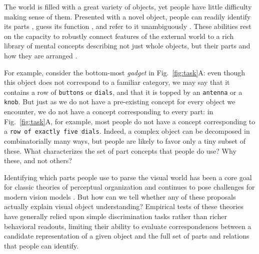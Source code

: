 \documentclass[10pt,letterpaper]{article}
\newcommand{\jda}[1]{{\color{blue}[jda: #1]}}
\begin{document}
\noindent The world is filled with a great variety of objects, yet people have little difficulty making sense of them. 
Presented with a novel object, people can readily identify its parts , guess its function , and refer to it unambiguously . 
These abilities rest on the capacity to robustly connect features of the external world to a rich library of mental concepts describing not just whole objects, but their parts and how they are arranged . 

For example, consider the bottom-most \emph{gadget} in Fig.~\ref{fig:task}A: even though this object does not correspond to a familiar category, we may say that it contains a row of \texttt{buttons} or \texttt{dials}, and that it is topped by an \texttt{antenna} or a \texttt{knob}.
But just as we do not have a pre-existing concept for every object we encounter, we do not have a concept corresponding to every part: in Fig.~\ref{fig:task}A, for example, most people do not have a concept corresponding to a \texttt{row of exactly five dials}. %
Indeed, a complex object can be decomposed in combinatorially many ways, but people are likely to favor only a tiny subset of these.
What characterizes the set of part concepts that people do use? Why these, and not others?

Identifying which parts people use to parse the visual world has been a core goal for classic theories of perceptual organization  and continues to pose challenges for modern vision models .
But how can we tell whether any of these proposals actually explain visual object understanding? 
Empirical tests of these theories have generally relied upon simple discrimination tasks rather than richer behavioral readouts, limiting their ability to evaluate correspondences between a candidate representation of a given object and the full set of parts and relations that people can identify.
\end{document}
